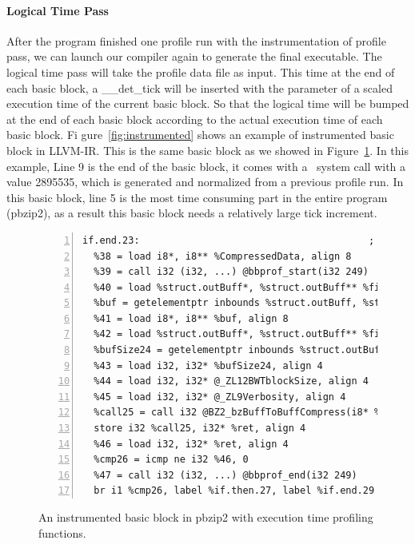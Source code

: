 \paragraph{Logical Time Pass}
After the program finished one profile run with the instrumentation of profile pass, we can launch our compiler again to generate the final executable. The logical time pass will take the profile data file as input. This time at the end of each basic block, a \_\_det\_tick will be inserted with the parameter of a scaled execution time of the current basic block. So that the logical time will be bumped at the end of each basic block according to the actual execution time of each basic block. Fi gure~\ref{fig:instrumented} shows an example of instrumented basic block in LLVM-IR. This is the same basic block as we showed in Figure~\ref{fig:profiled}. In this example, Line 9 is the end of the basic block, it comes with a \dettick\ system call with a value 2895535, which is generated and normalized from a previous profile run. In this basic block, line 5 is the most time consuming part in the entire program (pbzip2), as a result this basic block needs a relatively large tick increment.

\begin{figure}
\centering
\begin{lstlisting}[numbers=left, frame=single, basicstyle=\small, breaklines]
if.end.23:                                        ; preds = %for.end
  %38 = load i8*, i8** %CompressedData, align 8
  %39 = call i32 (i32, ...) @bbprof_start(i32 249)
  %40 = load %struct.outBuff*, %struct.outBuff** %fileData, align 8
  %buf = getelementptr inbounds %struct.outBuff, %struct.outBuff* %40, i32 0, i32 0
  %41 = load i8*, i8** %buf, align 8
  %42 = load %struct.outBuff*, %struct.outBuff** %fileData, align 8
  %bufSize24 = getelementptr inbounds %struct.outBuff, %struct.outBuff* %42, i32 0, i32 1
  %43 = load i32, i32* %bufSize24, align 4
  %44 = load i32, i32* @_ZL12BWTblockSize, align 4
  %45 = load i32, i32* @_ZL9Verbosity, align 4
  %call25 = call i32 @BZ2_bzBuffToBuffCompress(i8* %38, i32* %outSize, i8* %41, i32 %43, i32 %44, i32 %45, i32 30)
  store i32 %call25, i32* %ret, align 4
  %46 = load i32, i32* %ret, align 4
  %cmp26 = icmp ne i32 %46, 0
  %47 = call i32 (i32, ...) @bbprof_end(i32 249)
  br i1 %cmp26, label %if.then.27, label %if.end.29
\end{lstlisting}
\caption{An instrumented basic block in pbzip2 with execution time profiling functions.}
\label{fig:profiled}
\end{figure}

